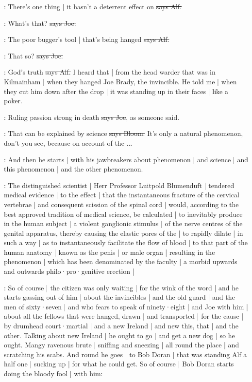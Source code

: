 \bergan:
There's one thing |
it hasn't a deterrent effect on
\sout{says Alf.}

\joe:
What's that?
\sout{says Joe.}

\bergan:
The poor bugger's tool |
that's being hanged
\sout{says Alf.}

\joe:
That so?
\sout{says Joe.}

\bergan:
God's truth
\sout{says Alf.}
I heard that |
from the head warder that was in Kilmainham |
when they hanged Joe Brady,
the invincible.
He told me |
when they cut him down after the drop |
it was standing up in their faces |
like a poker.

\joe:
Ruling passion strong in death
\sout{says Joe},
as someone said.

\Bloom:
That can be explained by science
\sout{says Bloom.}
It's only a natural phenomenon,
don't you see,
because on account of the ...

\Nq:
And then he starts |
with his jawbreakers about phenomenon |
and science |
and this phenomenon |
and the other phenomenon.

:
The distinguished scientist |
Herr Professor Luitpold Blumenduft |
tendered medical evidence |
to the effect |
that the instantaneous fracture of the cervical vertebrae
 |
and consequent scission of the spinal cord |
would,
according to the best approved tradition of medical science,
be calculated |
to inevitably produce in the human subject |
a violent ganglionic stimulus |
of the nerve centres of the genital apparatus,
thereby causing the elastic pores of the  |
to rapidly dilate |
in such a way |
as to instantaneously facilitate the flow of blood |
to that part of the human anatomy |
known as the penis |
or male organ |
resulting in the phenomenon |
which has been denominated by the faculty |
a morbid upwards and outwards philo·pro·genitive erection |

\Nq:
So of course |
the citizen was only waiting |
for the wink of the word |
and he starts gassing out of him
 |
about the invincibles |
and the old guard |
and the men of sixty·seven |
and who fears to speak of ninety·eight |
and Joe with him |
about all the fellows that were hanged,
drawn |
and transported |
for the cause |
by drumhead court·martial |
and a new Ireland |
and new this,
that |
and the other.
Talking about new Ireland |
he ought to go |
and get a new dog |
so he ought.
Mangy ravenous brute |
sniffing and sneezing |
all round the place |
and scratching his scabs.
And round he goes |
to Bob Doran |
that was standing Alf a half one |
sucking up |
for what he could get.
So of course |
Bob Doran starts doing the bloody fool |
with him:

